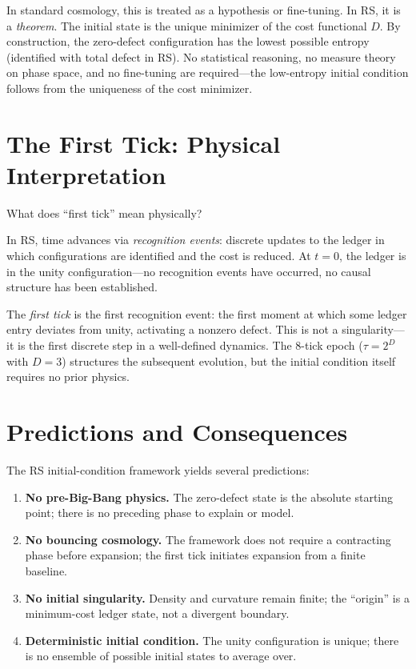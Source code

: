 \documentclass[12pt,a4paper]{article}
\theoremstyle{definition}
\theoremstyle{remark}
\begin{document}
In standard cosmology, this is treated as a hypothesis or fine-tuning.
In RS, it is a \emph{theorem}.
The initial state is the unique minimizer of the cost functional $D$.
By construction, the zero-defect configuration has the lowest possible
entropy (identified with total defect in RS).
No statistical reasoning, no measure theory on phase space, and no
fine-tuning are required---the low-entropy initial condition follows from
the uniqueness of the cost minimizer.

\section{The First Tick: Physical Interpretation}

What does ``first tick'' mean physically?

In RS, time advances via \emph{recognition events}: discrete updates to the
ledger in which configurations are identified and the cost is reduced.
At $t = 0$, the ledger is in the unity configuration---no recognition events
have occurred, no causal structure has been established.

The \emph{first tick} is the first recognition event: the first moment at
which some ledger entry deviates from unity, activating a nonzero defect.
This is not a singularity---it is the first discrete step in a well-defined
dynamics.
The 8-tick epoch ($\tau = 2^D$ with $D = 3$) structures the subsequent
evolution, but the initial condition itself requires no prior physics.

\section{Predictions and Consequences}

The RS initial-condition framework yields several predictions:

\begin{enumerate}[label=(\roman*)]
\item \textbf{No pre-Big-Bang physics.} The zero-defect state is the absolute
starting point; there is no preceding phase to explain or model.
\item \textbf{No bouncing cosmology.} The framework does not require a
contracting phase before expansion; the first tick initiates expansion from
a finite baseline.
\item \textbf{No initial singularity.} Density and curvature remain finite;
the ``origin'' is a minimum-cost ledger state, not a divergent boundary.
\item \textbf{Deterministic initial condition.} The unity configuration is
unique; there is no ensemble of possible initial states to average over.
\end{enumerate}
\end{document}
